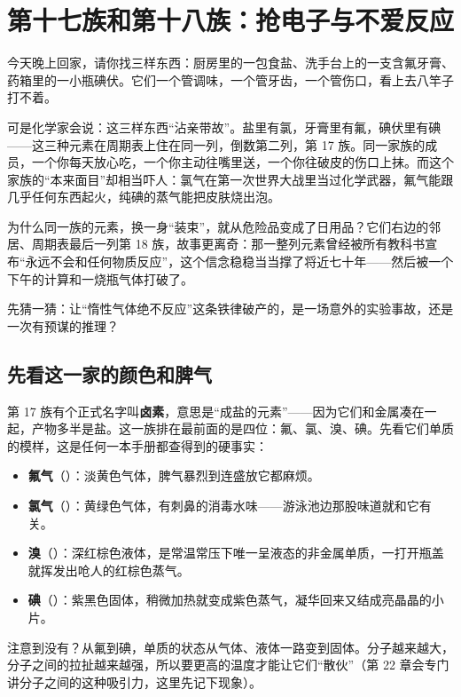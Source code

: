 \chapter{第十七族和第十八族：抢电子与不爱反应}

\begin{kaichang}
今天晚上回家，请你找三样东西：厨房里的一包食盐、洗手台上的一支含氟牙膏、药箱里的一小瓶碘伏。它们一个管调味，一个管牙齿，一个管伤口，看上去八竿子打不着。

可是化学家会说：这三样东西“沾亲带故”。盐里有氯，牙膏里有氟，碘伏里有碘——这三种元素在周期表上住在同一列，倒数第二列，第 17 族。同一家族的成员，一个你每天放心吃，一个你主动往嘴里送，一个你往破皮的伤口上抹。而这个家族的“本来面目”却相当吓人：氯气在第一次世界大战里当过化学武器，氟气能跟几乎任何东西起火，纯碘的蒸气能把皮肤烧出泡。

为什么同一族的元素，换一身“装束”，就从危险品变成了日用品？它们右边的邻居、周期表最后一列第 18 族，故事更离奇：那一整列元素曾经被所有教科书宣布“永远不会和任何物质反应”，这个信念稳稳当当撑了将近七十年——然后被一个下午的计算和一烧瓶气体打破了。

先猜一猜：让“惰性气体绝不反应”这条铁律破产的，是一场意外的实验事故，还是一次有预谋的推理？
\end{kaichang}

\section{先看这一家的颜色和脾气}

第 17 族有个正式名字叫\textbf{卤素}，意思是“成盐的元素”——因为它们和金属凑在一起，产物多半是盐。这一族排在最前面的是四位：氟、氯、溴、碘。先看它们单质的模样，这是任何一本手册都查得到的硬事实：

\begin{itemize}[itemsep=2pt]
\item \textbf{氟气}（）：淡黄色气体，脾气暴烈到连盛放它都麻烦。
\item \textbf{氯气}（）：黄绿色气体，有刺鼻的消毒水味——游泳池边那股味道就和它有关。
\item \textbf{溴}（）：深红棕色液体，是常温常压下唯一呈液态的非金属单质，一打开瓶盖就挥发出呛人的红棕色蒸气。
\item \textbf{碘}（）：紫黑色固体，稍微加热就变成紫色蒸气，凝华回来又结成亮晶晶的小片。
\end{itemize}

注意到没有？从氟到碘，单质的状态从气体、液体一路变到固体。分子越来越大，分子之间的拉扯越来越强，所以要更高的温度才能让它们“散伙”（第 22 章会专门讲分子之间的这种吸引力，这里先记下现象）。

